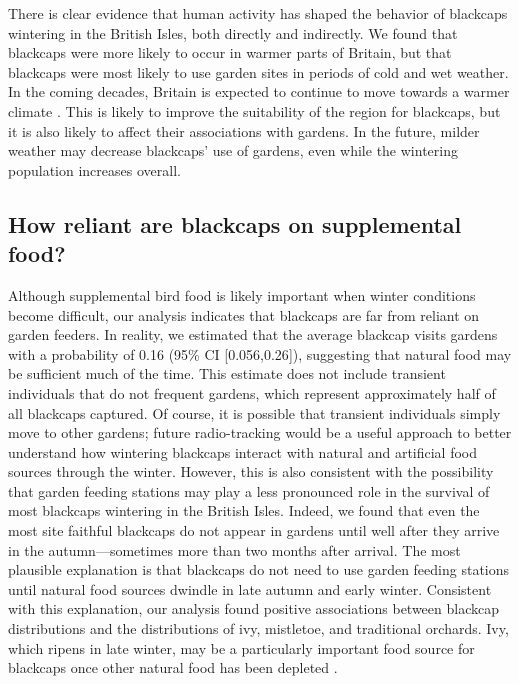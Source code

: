 \documentclass[a4paper, nobind]{templates/ociamthesis}
\begin{document}
There is clear evidence that human activity has shaped the behavior of blackcaps wintering in the British Isles, both directly and indirectly. We found that blackcaps were more likely to occur in warmer parts of Britain, but that blackcaps were most likely to use garden sites in periods of cold and wet weather. In the coming decades, Britain is expected to continue to move towards a warmer climate \autocite{loweUKCP18ScienceOverview2018}. This is likely to improve the suitability of the region for blackcaps, but it is also likely to affect their associations with gardens. In the future, milder weather may decrease blackcaps' use of gardens, even while the wintering population increases overall.

\hypertarget{how-reliant-are-blackcaps-on-supplemental-food}{%
\subsection{How reliant are blackcaps on supplemental food?}\label{how-reliant-are-blackcaps-on-supplemental-food}}

Although supplemental bird food is likely important when winter conditions become difficult, our analysis indicates that blackcaps are far from reliant on garden feeders. In reality, we estimated that the average blackcap visits gardens with a probability of 0.16 (95\% CI {[}0.056,0.26{]}), suggesting that natural food may be sufficient much of the time. This estimate does not include transient individuals that do not frequent gardens, which represent approximately half of all blackcaps captured. Of course, it is possible that transient individuals simply move to other gardens; future radio-tracking would be a useful approach to better understand how wintering blackcaps interact with natural and artificial food sources through the winter. However, this is also consistent with the possibility that garden feeding stations may play a less pronounced role in the survival of most blackcaps wintering in the British Isles. Indeed, we found that even the most site faithful blackcaps do not appear in gardens until well after they arrive in the autumn---sometimes more than two months after arrival. The most plausible explanation is that blackcaps do not need to use garden feeding stations until natural food sources dwindle in late autumn and early winter. Consistent with this explanation, our analysis found positive associations between blackcap distributions and the distributions of ivy, mistletoe, and traditional orchards. Ivy, which ripens in late winter, may be a particularly important food source for blackcaps once other natural food has been depleted \autocite{snowBirdsBerries2010}.
\end{document}
